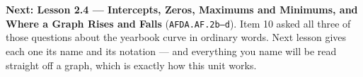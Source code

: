 \documentclass[10pt]{article}
\begin{document}
\begin{extensionbox}
\begin{enumerate}[label=(\alph*), leftmargin=1.6em, itemsep=5pt, topsep=4pt]
\\
\\
\end{enumerate}
\end{extensionbox}

\vspace{0.10in}

\begin{remindbox}
\small
\textbf{Next: Lesson 2.4 --- Intercepts, Zeros, Maximums and Minimums, and Where a Graph Rises and
Falls} (\texttt{AFDA.AF.2b--d}). Item 10 asked all three of those questions about the yearbook curve
in ordinary words. Next lesson gives each one its name and its notation --- and everything you name
will be read straight off a graph, which is exactly how this unit works.
\end{remindbox}
\end{document}
